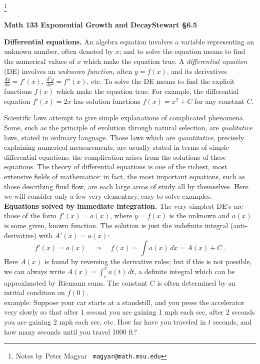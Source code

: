 \documentclass[11pt]{article}
\begin{document}
\footnote[0]{Notes by Peter Magyar \ {\tt magyar@math.msu.edu}}
\vspace{-1em}

\centerline{\bf Math 133\hspace{1.5em} \hfill{\Large\bf
Exponential Growth and Decay}\hfill Stewart \S6.5}
\vspace{1em}

\noindent 
{\bf Differential equations.} An algebra equation involves a variable representing an unknown number, often denoted by $x$; 
and to solve the equation means to find the numerical values of $x$ which make the equation true.
 A {\it differential equation} (DE) involves an {\it unknown function}, often $y=f(x)$, and its derivatives 
$\frac{dy}{dx}=f'(x)$, $\frac{d^2\!y}{dx^2}= f''(x)$, etc.
To solve the DE means to find the explicit functions $f(x)$ 
which make the equation true.
For example, the differential equation $f'(x) = 2x$ has solution functions
$f(x)=x^2+C$ for any constant $C$.
 
 Scientific laws attempt to give simple explanations of complicated phenomena. Some, such as the principle of evolution through natural selection, are {\it qualitative} laws, stated in ordinary language.  Those laws which are {\it quantitative}, precisely explaining numerical measurements, are usually stated in terms of simple differential equations: the complication arises from the solutions of these equations. The theory of differential equations is one of the richest, most extensive fields of mathematics: in fact, the most important equations, such as those describing fluid flow, are each large areas of study all by themselves. Here we will consider only a few very elementary, easy-to-solve examples.
\\[1em]
{\bf Equations solved by immediate integration.} The very simplest DE's are those of the form $f'(x)=a(x)$, where $y=f(x)$ is the unknown and $a(x)$ is some given, known function. The solution is just the indefinite integral (anti-derivative) with $A'(x)=a(x)$:
$$
f'(x) = a(x) \quad\Longrightarrow\quad
f(x)  = \int \!a(x)\,dx = A(x)+C\,.
$$
Here $A(x)$ is found by reversing the derivative rules; but if this is not possible, 
we can always write $A(x)=\int_c^x a(t)\,dt$, 
a definite integral which can be approximated by Riemann sums. 
The constant $C$ is often determined by an intitial condition on $f(0)$.
\\[.5em]
{\sc example:} Suppose your car starts at a standstill, and you press the accelerator very slowly so that after 1 second you are gaining 1 mph each sec, after 2 seconds you are gaining 2 mph each sec, etc. How far have you traveled in $t$ seconds, and how many seconds until you travel 1000 ft?
\end{document}
